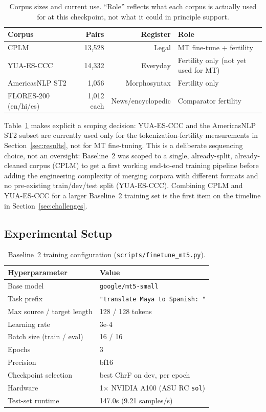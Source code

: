 \documentclass[11pt]{article}
\begin{document}
\begin{table}[h]
\centering
\small
\setlength{\tabcolsep}{3pt}
\begin{tabular}{p{2.6cm}rrp{1.3cm}}
\toprule
\textbf{Corpus} & \textbf{Pairs} & \textbf{Register} & \textbf{Role} \\
\midrule
CPLM & 13,528 & Legal & MT fine-tune + fertility \\
YUA-ES-CCC & 14,332 & Everyday & Fertility only (not yet used for MT) \\
AmericasNLP ST2 & 1,056 & Morphosyntax & Fertility only \\
FLORES-200 (en/hi/es) & 1,012 each & News/encyclopedic & Comparator fertility \\
\bottomrule
\end{tabular}
\caption{Corpus sizes and current use. ``Role'' reflects what each corpus is
actually used for at this checkpoint, not what it could in principle support.}
\label{tab:corpora}
\end{table}

Table~\ref{tab:corpora} makes explicit a scoping decision: YUA-ES-CCC and the
AmericasNLP ST2 subset are currently used only for the tokenization-fertility
measurements in Section~\ref{sec:results}, not for MT fine-tuning. This is a
deliberate sequencing choice, not an oversight: Baseline~2 was scoped to a
single, already-split, already-cleaned corpus (CPLM) to get a first working
end-to-end training pipeline before adding the engineering complexity of
merging corpora with different formats and no pre-existing train/dev/test
split (YUA-ES-CCC). Combining CPLM and YUA-ES-CCC for a larger Baseline~2
training set is the first item on the timeline in
Section~\ref{sec:challenges}.

\subsection{Experimental Setup}
\label{sec:setup}

\begin{table}[h]
\centering
\small
\begin{tabular}{ll}
\toprule
\textbf{Hyperparameter} & \textbf{Value} \\
\midrule
Base model & \texttt{google/mt5-small} \\
Task prefix & \texttt{"translate Maya to Spanish: "} \\
Max source / target length & 128 / 128 tokens \\
Learning rate & 3e-4 \\
Batch size (train / eval) & 16 / 16 \\
Epochs & 3 \\
Precision & bf16 \\
Checkpoint selection & best ChrF on dev, per epoch \\
Hardware & 1$\times$ NVIDIA A100 (ASU RC \texttt{sol}) \\
Test-set runtime & 147.0s (9.21 samples/s) \\
\bottomrule
\end{tabular}
\caption{Baseline~2 training configuration (\texttt{scripts/finetune\_mt5.py}).}
\label{tab:hyperparams}
\end{table}
\end{document}
